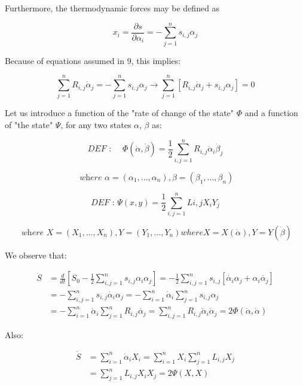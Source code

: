 \documentclass{article}
\begin{document}
Furthermore, the thermodynamic forces may be defined as 

\begin{equation}
x_i = \frac{\partial s}{ \partial \alpha_i} = - \sum_{j=1}^{n} s_{i,j} \alpha_j
\end{equation}

Because of equations assumed in 9, this implies:

\begin{equation}
\sum_{j=1}^{n} R_{i,j} \dot{\alpha}_{j} = - \sum_{j=1}^{n} s_{i,j} \alpha_j \rightarrow \sum_{j=1}^{n}[ R_{i,j} \dot{\alpha}_{j} +  s_{i,j} \alpha_j ] = 0
\end{equation}

Let us introduce a function of the "rate of change of the state" $\Phi$ and a function of "the state" $\Psi$, for any two states $\alpha$, $\beta$ as:

\begin{equation}
\textit{DEF : } \quad \Phi(\dot{\alpha},\dot{\beta}) = \frac{1}{2} \sum_{i,j=1}^{n} R_{i,j} \dot{\alpha}_i \dot{\beta}_j
\end{equation}

$$ \textit{ where } \alpha = (\alpha_1,...,\alpha_n), \beta = (\beta_1,...,\beta_n) $$

\begin{equation}
\textit{DEF : } \Psi(x,y) = \frac{1}{2} \sum_{i,j=1}^{n} L{i,j} X_i Y_j 
\end{equation}

$$ \textit{ where } X = (X_1,...,X_n),  Y = (Y_1,...,Y_n) where X=X(\dot{\alpha}) , Y=Y(\dot{\beta})$$

We observe that:

\begin{align}
\dot{S} & = \frac{d}{dt} [ S_0 - \frac{1}{2} \sum_{i,j=1}^{n} s_{i,j} \alpha_i \alpha_j ] =  - \frac{1}{2} \sum_{i,j=1}^{n} s_{i,j} [ \dot{ \alpha_i } \alpha_j  + \alpha_i \dot{ \alpha_j } ] \\
& = - \sum_{i,j=1}^{n} s_{i,j}  \dot{ \alpha_i } \alpha_j =  - \sum_{i=1}^{n} \dot{\alpha}_i  \sum_{j=1}^{n}  s_{i,j} \alpha_j \\
& =  - \sum_{i=1}^{n} \dot{\alpha}_i  \sum_{j=1}^{n} R_{i,j} \dot{\alpha_j} =  \sum_{i,j=1}^{n}  R_{i,j}  \dot{\alpha}_i  \dot{\alpha}_j = 2 \Phi(\dot{\alpha},\dot{\alpha})
\end{align}

Also:

\begin{align}
\dot{S} & =  \sum_{i=1}^{n} \dot{\alpha}_i X_i = \sum_{i=1}^{n} X_i \sum_{j=1}^{n}  L_{i,j} X_j \\
&= \sum_{j=1}^{n} L_{i,j} X_i X_j = 2 \Psi(X,X)
\end{align}
\end{document}
